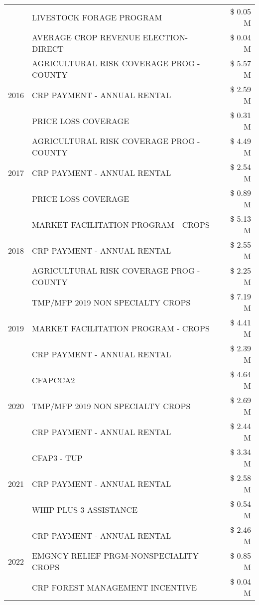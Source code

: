 \begin{tabular}{llr}
 & LIVESTOCK FORAGE PROGRAM & \$ 0.05 M \\
 & AVERAGE CROP REVENUE ELECTION-DIRECT & \$ 0.04 M \\
\cline{1-3}
\multirow[t]{3}{*}{2016} & AGRICULTURAL RISK COVERAGE PROG - COUNTY & \$ 5.57 M \\
 & CRP PAYMENT - ANNUAL RENTAL & \$ 2.59 M \\
 & PRICE LOSS COVERAGE & \$ 0.31 M \\
\cline{1-3}
\multirow[t]{3}{*}{2017} & AGRICULTURAL RISK COVERAGE PROG - COUNTY & \$ 4.49 M \\
 & CRP PAYMENT - ANNUAL RENTAL & \$ 2.54 M \\
 & PRICE LOSS COVERAGE & \$ 0.89 M \\
\cline{1-3}
\multirow[t]{3}{*}{2018} & MARKET FACILITATION PROGRAM - CROPS & \$ 5.13 M \\
 & CRP PAYMENT - ANNUAL RENTAL & \$ 2.55 M \\
 & AGRICULTURAL RISK COVERAGE PROG - COUNTY & \$ 2.25 M \\
\cline{1-3}
\multirow[t]{3}{*}{2019} & TMP/MFP 2019 NON SPECIALTY CROPS & \$ 7.19 M \\
 & MARKET FACILITATION PROGRAM - CROPS & \$ 4.41 M \\
 & CRP PAYMENT - ANNUAL RENTAL & \$ 2.39 M \\
\cline{1-3}
\multirow[t]{3}{*}{2020} & CFAPCCA2 & \$ 4.64 M \\
 & TMP/MFP 2019 NON SPECIALTY CROPS & \$ 2.69 M \\
 & CRP PAYMENT - ANNUAL RENTAL & \$ 2.44 M \\
\cline{1-3}
\multirow[t]{3}{*}{2021} & CFAP3 - TUP & \$ 3.34 M \\
 & CRP PAYMENT - ANNUAL RENTAL & \$ 2.58 M \\
 & WHIP PLUS 3 ASSISTANCE & \$ 0.54 M \\
\cline{1-3}
\multirow[t]{3}{*}{2022} & CRP PAYMENT - ANNUAL RENTAL & \$ 2.46 M \\
 & EMGNCY RELIEF PRGM-NONSPECIALITY CROPS & \$ 0.85 M \\
 & CRP FOREST MANAGEMENT INCENTIVE & \$ 0.04 M \\
\cline{1-3}
\bottomrule
\end{tabular}
